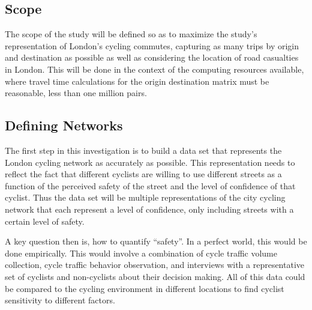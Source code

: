 


\subsection{Scope}

The scope of the study will be defined so as to maximize the study's representation of London's cycling commutes, capturing as many trips by origin and destination as possible as well as considering the location of road casualties in London. This will be done in the context of the computing resources available, where travel time calculations for the origin destination matrix must be reasonable, less than one million pairs. 

\subsection{Defining Networks}

The first step in this investigation is to build a data set that represents the London cycling network as accurately as possible. This representation needs to reflect the fact that different cyclists are willing to use different streets as a function of the perceived safety of the street and the level of confidence of that cyclist. Thus the data set will be multiple representations of the city cycling network that each represent a level of confidence, only including streets with a certain level of safety. 

A key question then is, how to quantify ``safety''. In a perfect world, this would be done empirically. This would involve a combination of cycle traffic volume collection, cycle traffic behavior observation, and interviews with a representative set of cyclists and non-cyclists about their decision making. All of this data could be compared to the cycling environment in different locations to find cyclist sensitivity to different factors. 

